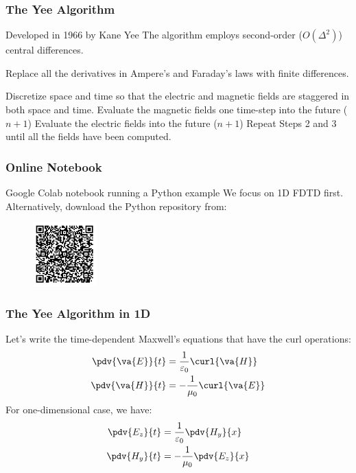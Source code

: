\documentclass[10pt]{beamer}
\newcommand{\E}{\varepsilon}  %
\renewcommand{\u}{\mu}  %
\begin{document}
\begin{frame}
    \frametitle{The Yee Algorithm}
    \begin{outline}
        \1 Developed in 1966 by Kane Yee
        \1 The algorithm employs second-order ($O(\Delta^2)$) central differences.
    \end{outline}
    \begin{outline}[enumerate]
        \1 Replace all the derivatives in Ampere's and Faraday's laws with finite differences.

        \2 Discretize space and time so that the electric and magnetic fields are staggered in both space and time.
        \1 Evaluate the magnetic fields one time-step into the future ($n+1$)
        \1 Evaluate the electric fields into the future ($n +  1$)
        \1 Repeat Steps 2 and 3 until all the fields have been computed.
    \end{outline}
\end{frame}

\begin{frame}
    \frametitle{Online Notebook}
    \begin{outline}
        \1 Google Colab notebook running a Python example
        \1 We focus on 1D FDTD first.
        \1 Alternatively, download the Python repository from:
    \end{outline}
    \begin{figure}[h!]
        \centering
        \includegraphics[width=.45\textwidth]{qrcode.pdf}
    \end{figure}
\end{frame}

\begin{frame}
    \frametitle{The Yee Algorithm in 1D}
    Let's write the time-dependent Maxwell's equations that have the curl operations:
    \begin{align*}
        \pdv{\va{E}}{t} & = \frac{1}{\E_0} \curl{\va{H}}  \\
        \pdv{\va{H}}{t} & = -\frac{1}{\u_0} \curl{\va{E}}
    \end{align*}
    For one-dimensional case, we have:
    \begin{align*}
        \pdv{{E_z}}{t} & = \frac{1}{\E_0} \pdv{H_y}{x}  \\
        \pdv{{H_y}}{t} & = -\frac{1}{\u_0} \pdv{E_z}{x}
    \end{align*}


\end{frame}
\end{document}
